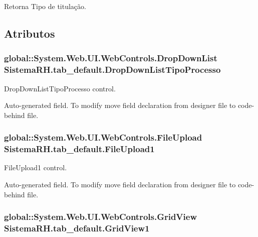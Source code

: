\begin{DoxyReturn}{Retorna}
Tipo de titulação.
\end{DoxyReturn}


\subsection{Atributos}
\hypertarget{class_sistema_r_h_1_1tab__default_ac3fee4391b73e5c9eb11b9e4a711a61d}{
\subsubsection[{DropDownListTipoProcesso}]{\setlength{\rightskip}{0pt plus 5cm}global::System.Web.UI.WebControls.DropDownList {\bf SistemaRH.tab\_\-default.DropDownListTipoProcesso}}}
\label{class_sistema_r_h_1_1tab__default_ac3fee4391b73e5c9eb11b9e4a711a61d}


DropDownListTipoProcesso control. 

Auto-\/generated field. To modify move field declaration from designer file to code-\/behind file. \hypertarget{class_sistema_r_h_1_1tab__default_a7b17d6066082461e0e2fdbf73f0866e6}{
\subsubsection[{FileUpload1}]{\setlength{\rightskip}{0pt plus 5cm}global::System.Web.UI.WebControls.FileUpload {\bf SistemaRH.tab\_\-default.FileUpload1}}}
\label{class_sistema_r_h_1_1tab__default_a7b17d6066082461e0e2fdbf73f0866e6}


FileUpload1 control. 

Auto-\/generated field. To modify move field declaration from designer file to code-\/behind file. \hypertarget{class_sistema_r_h_1_1tab__default_a4418a76da62516a6d4330b0137cbf234}{
\subsubsection[{GridView1}]{\setlength{\rightskip}{0pt plus 5cm}global::System.Web.UI.WebControls.GridView {\bf SistemaRH.tab\_\-default.GridView1}}}
\label{class_sistema_r_h_1_1tab__default_a4418a76da62516a6d4330b0137cbf234}


